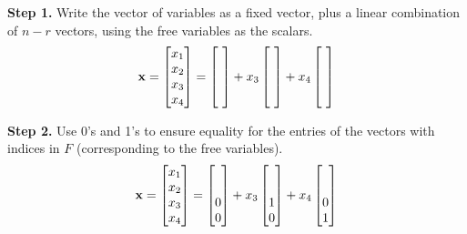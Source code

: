 \documentclass{ximera}
\begin{document}
\begin{example}
  \textbf{Step 1.}  Write the vector of variables as a fixed vector,
  plus a linear combination of $n-r$ vectors, using the free variables
  as the scalars.
  \[
    \vect{x}=\colvector{x_1\\x_2\\x_3\\x_4}=
    \colvector{\ \\\ \\\ \\\ }+x_3\colvector{\ \\\ \\\ \\\ }+x_4\colvector{\ \\\ \\\ \\\ }
  \]

  \textbf{Step 2.}  Use 0's and 1's to ensure equality for the entries
  of the vectors with indices in $F$ (corresponding to the free
  variables).
  \[
    \vect{x}=\colvector{x_1\\x_2\\x_3\\x_4}=
    \colvector{\ \\\ \\0\\0}+x_3\colvector{\ \\\ \\1\\0}+x_4\colvector{\ \\\ \\0\\1}
  \]


\end{example}
\end{document}
